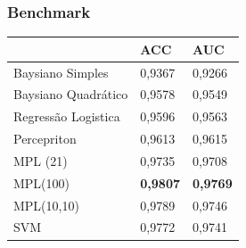 \documentclass{beamer}
\begin{document}
\begin{frame}
\frametitle{Benchmark}

\begin{table}
\begin{tabular}{l l l}
\toprule
 & \textbf{ACC} & \textbf{AUC}\\
\midrule
Baysiano Simples & 0,9367 & 0,9266 \\ 
Baysiano Quadrático & 0,9578 & 0,9549 \\ 
Regressão Logistica & 0,9596 & 0,9563 \\ 
Percepriton & 0,9613 & 0,9615 \\ 
MPL (21) & 0,9735 & 0,9708 \\ 
MPL(100) & \textbf{0,9807} & \textbf{0,9769} \\ 
MPL(10,10) & 0,9789 & 0,9746 \\ 
SVM & 0,9772 & 0,9741 \\ 

\bottomrule
\end{tabular}

\end{table}

\end{frame}
\end{document}
